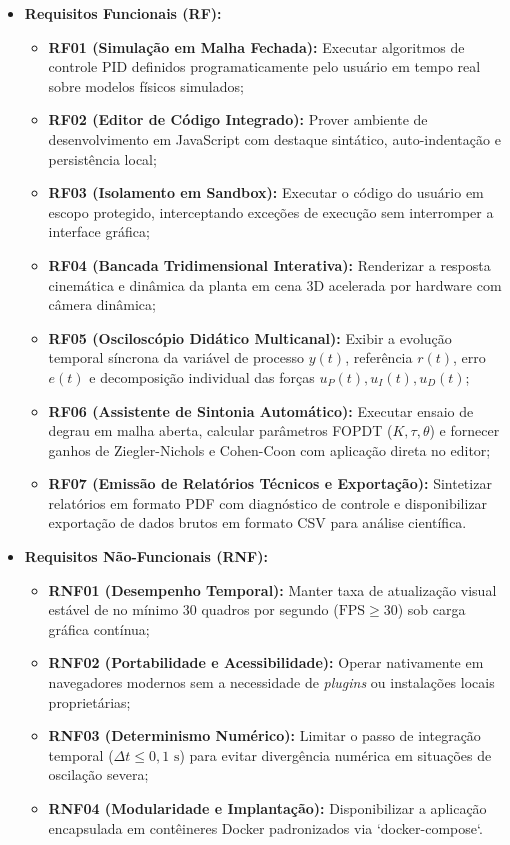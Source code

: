 \begin{itemize}
    \item \textbf{Requisitos Funcionais (RF):}
    \begin{itemize}
        \item \textbf{RF01 (Simulação em Malha Fechada):} Executar algoritmos de controle PID definidos programaticamente pelo usuário em tempo real sobre modelos físicos simulados;
        \item \textbf{RF02 (Editor de Código Integrado):} Prover ambiente de desenvolvimento em JavaScript com destaque sintático, auto-indentação e persistência local;
        \item \textbf{RF03 (Isolamento em Sandbox):} Executar o código do usuário em escopo protegido, interceptando exceções de execução sem interromper a interface gráfica;
        \item \textbf{RF04 (Bancada Tridimensional Interativa):} Renderizar a resposta cinemática e dinâmica da planta em cena 3D acelerada por hardware com câmera dinâmica;
        \item \textbf{RF05 (Osciloscópio Didático Multicanal):} Exibir a evolução temporal síncrona da variável de processo $y(t)$, referência $r(t)$, erro $e(t)$ e decomposição individual das forças $u_P(t), u_I(t), u_D(t)$;
        \item \textbf{RF06 (Assistente de Sintonia Automático):} Executar ensaio de degrau em malha aberta, calcular parâmetros FOPDT ($K, \tau, \theta$) e fornecer ganhos de Ziegler-Nichols e Cohen-Coon com aplicação direta no editor;
        \item \textbf{RF07 (Emissão de Relatórios Técnicos e Exportação):} Sintetizar relatórios em formato PDF com diagnóstico de controle e disponibilizar exportação de dados brutos em formato CSV para análise científica.
    \end{itemize}
    
    \item \textbf{Requisitos Não-Funcionais (RNF):}
    \begin{itemize}
        \item \textbf{RNF01 (Desempenho Temporal):} Manter taxa de atualização visual estável de no mínimo 30 quadros por segundo ($\text{FPS} \ge 30$) sob carga gráfica contínua;
        \item \textbf{RNF02 (Portabilidade e Acessibilidade):} Operar nativamente em navegadores modernos sem a necessidade de \textit{plugins} ou instalações locais proprietárias;
        \item \textbf{RNF03 (Determinismo Numérico):} Limitar o passo de integração temporal ($\Delta t \le 0{,}1\text{ s}$) para evitar divergência numérica em situações de oscilação severa;
        \item \textbf{RNF04 (Modularidade e Implantação):} Disponibilizar a aplicação encapsulada em contêineres Docker padronizados via `docker-compose`.
    \end{itemize}
\end{itemize}

